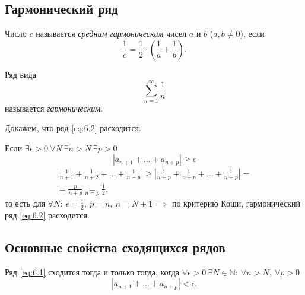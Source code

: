 \subsection{Гармонический ряд}

\begin{definition}
    Число $c$ называется \emph{средним гармоническим} чисел $a$ и $b$ ($a,b \ne 0$), если
    \[
        \frac{1}{c} = \frac{1}{2}\cdot \left(\frac{1}{a} + \frac{1}{b}\right).
    \]
\end{definition}

\begin{definition}
    Ряд вида
    \begin{equation}\label{eq:6.2}
        \sum_{n=1}^{\infty}\frac{1}{n}
    \end{equation}
    называется \emph{гармоническим}.
\end{definition}

\begin{note}
    Докажем, что ряд \ref{eq:6.2} расходится.

    Если $\exists\epsilon > 0 \ \forall N \ \exists n > N \ \exists p > 0$
    \[
        |a_{n+1} + \ldots + a_{n+p}| \geqslant \epsilon
    \]
    \begin{multline*}
        \left|\frac{1}{n+1} + \frac{1}{n+2} + \ldots + \frac{1}{n+p}\right| \geqslant \left|\frac{1}{n+p} + \frac{1}{n+p} + \ldots + \frac{1}{n+p}\right| = \\
        = \frac{p}{n+p} \underset{n = p}{=} \frac{1}{2},
    \end{multline*}
    то есть для $\forall N: \ \epsilon = \frac{1}{2}, \ p = n, \ n = N + 1 \implies$ по критерию Коши, гармонический ряд \ref{eq:6.2} расходится.
\end{note}

\newpage

\subsection{Основные свойства сходящихся рядов}

\begin{theorem}
    Ряд \ref{eq:6.1} сходится тогда и только тогда, когда $\forall \epsilon > 0 \ \exists N \in \mathbb{N}: \ \forall n > N, \ \forall p > 0$
    \[
        |a_{n+1} + \ldots + a_{n+p}| < \epsilon.
    \]
\end{theorem}

